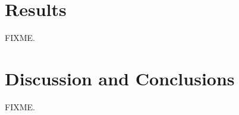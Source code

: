 \section{Results}

\begin{doublespace}
FIXME.
\end{doublespace}

\section{Discussion and Conclusions}

\begin{doublespace}
FIXME.
\end{doublespace}




